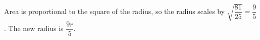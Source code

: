 Area is proportional to the square of the radius, so the radius scales by $\sqrt{\dfrac{81}{25}}=\dfrac{9}{5}$. The new radius is $\boxed{\dfrac{9r}{5}}$.
